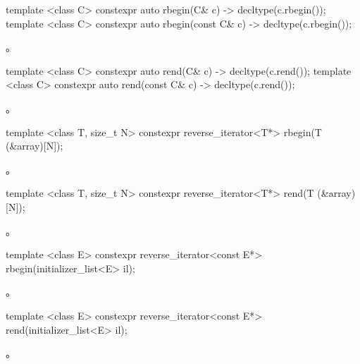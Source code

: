 %
\begin{itemdecl}
template <class C> constexpr auto rbegin(C& c) -> decltype(c.rbegin());
template <class C> constexpr auto rbegin(const C& c) -> decltype(c.rbegin());
\end{itemdecl}
\begin{itemdescr}
\pnum \returns {}。
\end{itemdescr}

%
\begin{itemdecl}
template <class C> constexpr auto rend(C& c) -> decltype(c.rend());
template <class C> constexpr auto rend(const C& c) -> decltype(c.rend());
\end{itemdecl}
\begin{itemdescr}
\pnum \returns {}。
\end{itemdescr}

%
\begin{itemdecl}
template <class T, size_t N> constexpr reverse_iterator<T*> rbegin(T (&array)[N]);
\end{itemdecl}
\begin{itemdescr}
\pnum \returns {}。
\end{itemdescr}

%
\begin{itemdecl}
template <class T, size_t N> constexpr reverse_iterator<T*> rend(T (&array)[N]);
\end{itemdecl}
\begin{itemdescr}
\pnum \returns {}。
\end{itemdescr}

%
\begin{itemdecl}
template <class E> constexpr reverse_iterator<const E*> rbegin(initializer_list<E> il);
\end{itemdecl}
\begin{itemdescr}
\pnum \returns {}。
\end{itemdescr}

%
\begin{itemdecl}
template <class E> constexpr reverse_iterator<const E*> rend(initializer_list<E> il);
\end{itemdecl}
\begin{itemdescr}
\pnum \returns {}。
\end{itemdescr}

